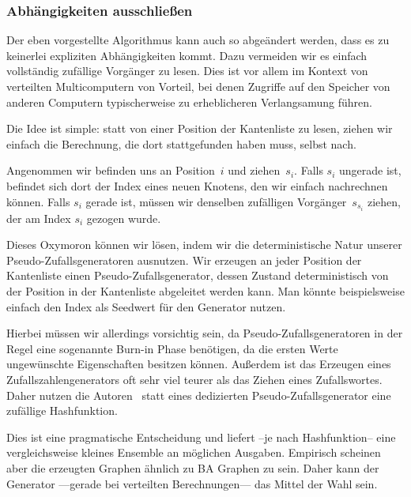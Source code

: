 \subsubsection{Abhängigkeiten ausschließen}
Der eben vorgestellte Algorithmus kann auch so abgeändert werden, dass es zu keinerlei expliziten Abhängigkeiten kommt.
Dazu vermeiden wir es einfach vollständig zufällige Vorgänger zu lesen.
Dies ist vor allem im Kontext von verteilten Multicomputern von Vorteil, bei denen Zugriffe auf den Speicher von anderen Computern typischerweise zu erheblicheren Verlangsamung führen.

Die Idee ist simple: statt von einer Position der Kantenliste zu lesen, ziehen wir einfach die Berechnung, die dort stattgefunden haben muss, selbst nach.

Angenommen wir befinden uns an Position~$i$ und ziehen~$s_i$.
Falls $s_i$ ungerade ist, befindet sich dort der Index eines neuen Knotens, den wir einfach nachrechnen können.
Falls $s_i$ gerade ist, müssen wir  denselben zufälligen Vorgänger~$s_{s_i}$ ziehen, der am Index $s_i$ gezogen wurde.

Dieses Oxymoron können wir lösen, indem wir die deterministische Natur unserer Pseudo-Zufallsgeneratoren ausnutzen.
Wir erzeugen an jeder Position der Kantenliste einen Pseudo-Zufallsgenerator, dessen Zustand deterministisch von der Position in der Kantenliste abgeleitet werden kann.
Man könnte beispielsweise einfach den Index als Seedwert für den Generator nutzen.

Hierbei müssen wir allerdings vorsichtig sein, da Pseudo-Zufallsgeneratoren in der Regel eine sogenannte Burn-in Phase benötigen, da die ersten Werte ungewünschte Eigenschaften besitzen können.
Außerdem ist das Erzeugen eines Zufallszahlengenerators oft sehr viel teurer als das Ziehen eines Zufallswortes.
Daher nutzen die Autoren~\cite{SANDERS2016489} statt eines dedizierten Pseudo-Zufallsgenerator eine zufällige Hashfunktion.

Dies ist eine pragmatische Entscheidung und liefert --je nach Hashfunktion-- eine vergleichsweise kleines Ensemble an möglichen Ausgaben.
Empirisch scheinen aber die erzeugten Graphen ähnlich zu BA Graphen zu sein.
Daher kann der Generator ---gerade bei verteilten Berechnungen--- das Mittel der Wahl sein.
